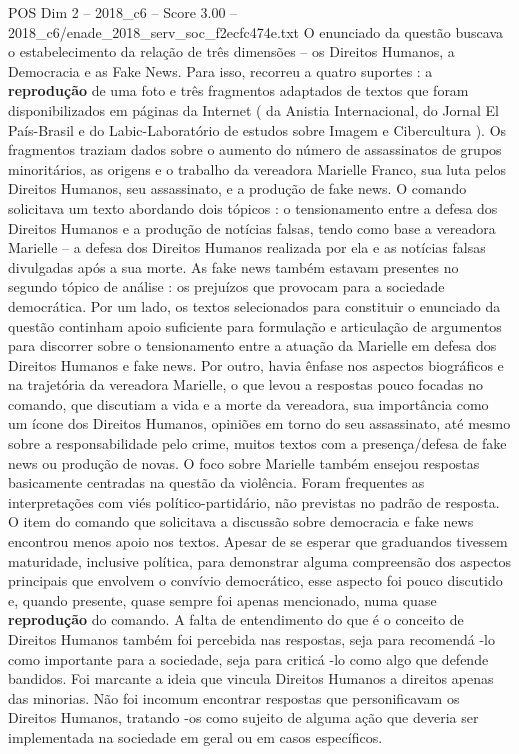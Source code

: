 \begin{textsample}{POS Dim 2 – 2018\_c6 – Score 3.00 – 2018\_c6/enade\_2018\_serv\_soc\_f2ecfc474e.txt}
O enunciado da questão buscava o estabelecimento da relação de três dimensões – os Direitos Humanos, a Democracia e as Fake News.
Para isso, recorreu a quatro suportes : a \textbf{reprodução} de uma foto e três fragmentos adaptados de textos que foram disponibilizados em páginas da Internet ( da Anistia Internacional, do Jornal El País-Brasil e do Labic-Laboratório de estudos sobre Imagem e Cibercultura ).
Os fragmentos traziam dados sobre o aumento do número de assassinatos de grupos minoritários, as origens e o trabalho da vereadora Marielle Franco, sua luta pelos Direitos Humanos, seu assassinato, e a produção de fake news.
O comando solicitava um texto abordando dois tópicos : o tensionamento entre a defesa dos Direitos Humanos e a produção de notícias falsas, tendo como base a vereadora Marielle – a defesa dos Direitos Humanos realizada por ela e as notícias falsas divulgadas após a sua morte.
As fake news também estavam presentes no segundo tópico de análise : os prejuízos que provocam para a sociedade democrática.
Por um lado, os textos selecionados para constituir o enunciado da questão continham apoio suficiente para formulação e articulação de argumentos para discorrer sobre o tensionamento entre a atuação da Marielle em defesa dos Direitos Humanos e fake news.
Por outro, havia ênfase nos aspectos biográficos e na trajetória da vereadora Marielle, o que levou a respostas pouco focadas no comando, que discutiam a vida e a morte da vereadora, sua importância como um ícone dos Direitos Humanos, opiniões em torno do seu assassinato, até mesmo sobre a responsabilidade pelo crime, muitos textos com a presença/defesa de fake news ou produção de novas.
O foco sobre Marielle também ensejou respostas basicamente centradas na questão da violência.
Foram frequentes as interpretações com viés político-partidário, não previstas no padrão de resposta.
O item do comando que solicitava a discussão sobre democracia e fake news encontrou menos apoio nos textos.
Apesar de se esperar que graduandos tivessem maturidade, inclusive política, para demonstrar alguma compreensão dos aspectos principais que envolvem o convívio democrático, esse aspecto foi pouco discutido e, quando presente, quase sempre foi apenas mencionado, numa quase \textbf{reprodução} do comando.
A falta de entendimento do que é o conceito de Direitos Humanos também foi percebida nas respostas, seja para recomendá -lo como importante para a sociedade, seja para criticá -lo como algo que defende bandidos.
Foi marcante a ideia que vincula Direitos Humanos a direitos apenas das minorias.
Não foi incomum encontrar respostas que personificavam os Direitos Humanos, tratando -os como sujeito de alguma ação que deveria ser implementada na sociedade em geral ou em casos específicos.

\end{textsample}
